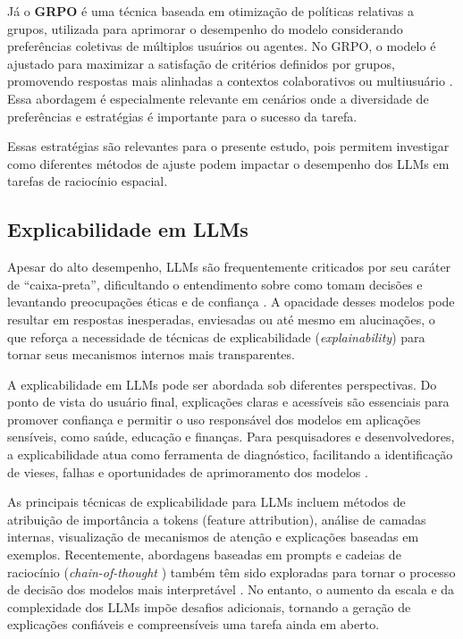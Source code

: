 Já o \textbf{GRPO} é uma técnica baseada em otimização de políticas relativas a grupos, utilizada para aprimorar o desempenho do modelo considerando preferências coletivas de múltiplos usuários ou agentes. No GRPO, o modelo é ajustado para maximizar a satisfação de critérios definidos por grupos, promovendo respostas mais alinhadas a contextos colaborativos ou multiusuário \cite{dao2025alphamaze}. Essa abordagem é especialmente relevante em cenários onde a diversidade de preferências e estratégias é importante para o sucesso da tarefa.

Essas estratégias são relevantes para o presente estudo, pois permitem investigar como diferentes métodos de ajuste podem impactar o desempenho dos LLMs em tarefas de raciocínio espacial.

\subsection{Explicabilidade em LLMs}

Apesar do alto desempenho, LLMs são frequentemente criticados por seu caráter de “caixa-preta”, dificultando o entendimento sobre como tomam decisões e levantando preocupações éticas e de confiança \cite{zhao2023explainability, cambria2024xai, luo2024fromunderstanding}. A opacidade desses modelos pode resultar em respostas inesperadas, enviesadas ou até mesmo em alucinações, o que reforça a necessidade de técnicas de explicabilidade (\textit{explainability}) para tornar seus mecanismos internos mais transparentes.

A explicabilidade em LLMs pode ser abordada sob diferentes perspectivas. Do ponto de vista do usuário final, explicações claras e acessíveis são essenciais para promover confiança e permitir o uso responsável dos modelos em aplicações sensíveis, como saúde, educação e finanças. Para pesquisadores e desenvolvedores, a explicabilidade atua como ferramenta de diagnóstico, facilitando a identificação de vieses, falhas e oportunidades de aprimoramento dos modelos \cite{zhao2023explainability, luo2024fromunderstanding}.

As principais técnicas de explicabilidade para LLMs incluem métodos de atribuição de importância a tokens (feature attribution), análise de camadas internas, visualização de mecanismos de atenção e explicações baseadas em exemplos. Recentemente, abordagens baseadas em prompts e cadeias de raciocínio (\textit{chain-of-thought} \cite{wei2023chainofthought}) também têm sido exploradas para tornar o processo de decisão dos modelos mais interpretável \cite{zhao2023explainability}. No entanto, o aumento da escala e da complexidade dos LLMs impõe desafios adicionais, tornando a geração de explicações confiáveis e compreensíveis uma tarefa ainda em aberto.


